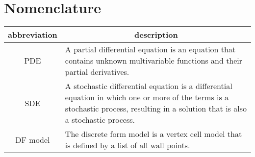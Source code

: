 \section*{Nomenclature}

\begin{table}[h!]
\centering
\begin{tabular}{c p{12cm}} %
\hline
\textbf{abbreviation} & \multicolumn{1}{c}{\textbf{description}}\\ 
\midrule
PDE &  A partial differential equation is an equation that contains unknown multivariable functions and their partial derivatives. \\
SDE &  A stochastic differential equation is a differential equation in which one or more of the terms is a stochastic process, resulting in a solution that is also a stochastic process. \\
DF model & The discrete form model is a vertex cell model that is defined by a list of all wall points. \\
\bottomrule
\end{tabular}
\end{table}